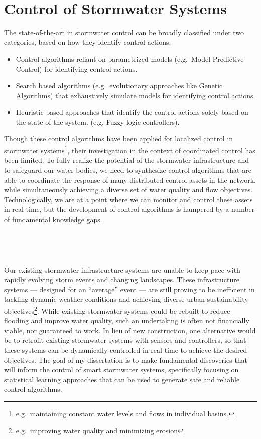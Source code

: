 \ 

\section{Control of Stormwater Systems} 
The state-of-the-art in stormwater control can be broadly classified under two categories, based on how they identify control actions:
\begin{itemize}
	\item Control algorithms reliant on parametrized models (e.g.\ Model Predictive Control) for identifying control actions.
	\item Search based algorithms (e.g.\ evolutionary approaches like Genetic Algorithms) that exhaustively simulate models for identifying control actions.
	\item Heuristic based approaches that identify the control actions solely based on the state of the system. (e.g. Fuzzy logic controllers). 
\end{itemize}
Though these control algorithms have been applied for localized control in stormwater systems\footnote{e.g.\ maintaining constant water levels and flows in individual basins.}, their investigation in the context of coordinated control has been limited.
To fully realize the potential of the stormwater infrastructure and to safeguard our water bodies, we need to synthesize control algorithms that are able to coordinate the response of many distributed control assets in the network, while simultaneously achieving a diverse set of water quality and flow objectives. 
Technologically, we are at a point where we can monitor and control these assets in real-time, but the development of control algorithms is hampered by a number of fundamental knowledge gaps.

\




\

Our existing stormwater infrastructure systems are unable to keep pace with rapidly evolving storm events and changing landscapes.
These infrastructure systems --- designed for an ``average'' event --- are still proving to be inefficient in tackling dynamic weather conditions and achieving diverse urban sustainability objectives\footnote{e.g.\ improving water quality and minimizing erosion}.
While existing stormwater systems could be rebuilt to reduce flooding and improve water quality, such an undertaking is often not financially viable, nor guaranteed to work.
In lieu of new construction, one alternative would be to retrofit  existing stormwater systems with sensors and controllers, so that these systems can be dynamically controlled in real-time to achieve the desired objectives.
The goal of my dissertation is to make fundamental discoveries that will inform the control of smart stormwater systems, specifically focusing on statistical learning approaches that can be used to generate safe and reliable control algorithms.

